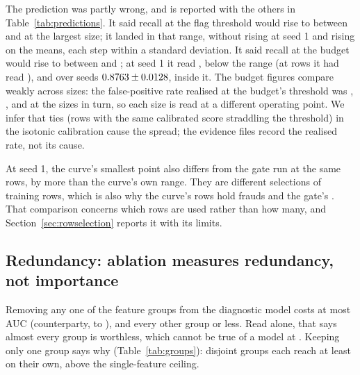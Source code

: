 The prediction was partly wrong, and is reported with the others in Table~\ref{tab:predictions}.
It said recall at the flag threshold would rise to between \nLcPredLow{} and \nLcPredHigh{} at the
largest size; it landed in that range, without rising at seed 1 and rising on
the means, each step within a standard deviation. It said recall at the \nFPRBudget{} budget would rise to between \nLcPredBudgetLow{} and
\nLcPredBudgetHigh{}; at seed 1 it read \nLcBudgetRecallD{} \nLcBudgetRecallciD{}, below the range
(at \nLcTrainC{} rows it had read \nLcBudgetRecallC{}), and over \nSeeds{} seeds $0.8763 \pm 0.0128$,
inside it. The budget figures compare weakly across sizes: the false-positive rate realised at the
budget's threshold was \nLcRealFprA{}, \nLcRealFprB{}, \nLcRealFprC{} and \nLcRealFprD{} at the
sizes in turn, so each size is read at a different operating point. We infer that ties (rows with the same calibrated score straddling the threshold) in the
isotonic calibration cause the spread; the evidence files record the realised rate, not its cause.

At seed 1, the curve's smallest point also differs from the gate run at the same \nTrainUsed{}
rows, by more than the curve's own range. They are different selections of training rows, which
is also why the curve's \nLcTrainA{} rows hold \nLcFraudA{} frauds and the gate's \nGateTrainFraud{}. That comparison concerns which rows are used rather than how
many, and Section~\ref{sec:rowselection} reports it with its limits.

\subsection{Redundancy: ablation measures redundancy, not importance}
\label{sec:redundancy}

Removing any one of the \nFeatureGroups{} feature groups from the diagnostic model costs at most
\nGroupMaxDrop{} AUC (counterparty, to \nGroupWithoutCounterparty{}), and every other group
\nGroupsAtMostSmall{} or less. Read alone, that says almost every group is worthless, which cannot
be true of a model at \nBatAUC{}. Keeping only one group says why (Table~\ref{tab:groups}):
\nGroupsAboveCeiling{} disjoint groups each reach at least \nGroupGeographic{} on their own, above
the \nCeiling{} single-feature ceiling.

